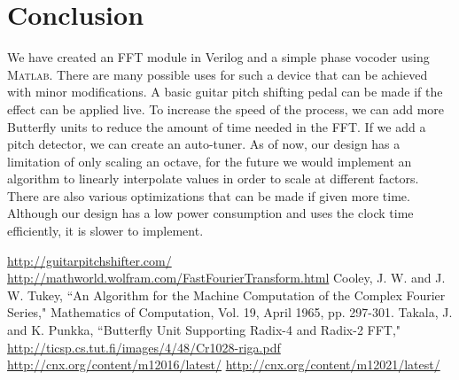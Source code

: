 \documentclass[twoside]{article}
\begin{document}
\section{Conclusion}
We have created an FFT module in Verilog and a simple phase vocoder using \textsc{Matlab}. There are many possible uses for such a device that can be achieved
with minor modifications. A basic guitar pitch shifting pedal can be made if the effect can be applied live. 
To increase the speed of the process, we can add more Butterfly units to reduce the amount of time needed in the FFT.  
If we add a pitch detector, we can create an auto-tuner. As of now, our design has a limitation of only scaling an octave, for the future
we would implement an algorithm to linearly interpolate values in order to scale at different factors. There are also various optimizations
that can be made if given more time. Although our design has a low power consumption and uses the clock time efficiently, it is slower 
to implement.


\begin{thebibliography}{10}
 \url{http://guitarpitchshifter.com/}
 \url{http://mathworld.wolfram.com/FastFourierTransform.html}
 	Cooley, J. W. and J. W. Tukey, ``An Algorithm for the Machine Computation of the Complex Fourier Series," Mathematics of Computation, Vol. 19, April 1965, pp. 297-301.
 Takala, J. and K. Punkka, ``Butterfly Unit Supporting Radix-4 and Radix-2 FFT," \url{http://ticsp.cs.tut.fi/images/4/48/Cr1028-riga.pdf}
 \url{http://cnx.org/content/m12016/latest/}
 \url{http://cnx.org/content/m12021/latest/}
\end{thebibliography}
\end{document}
